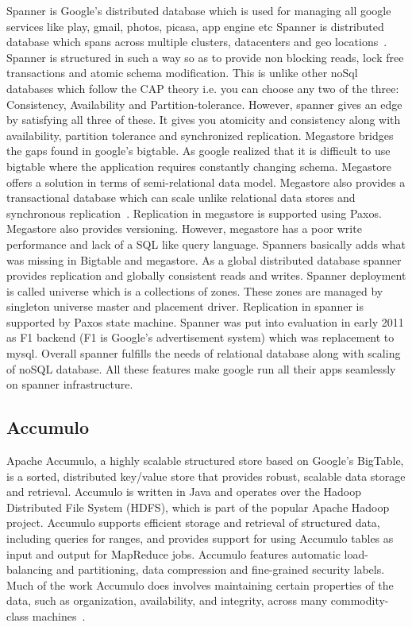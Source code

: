 Spanner is Google's distributed database which is used for managing
all google services like play, gmail, photos, picasa, app engine etc
Spanner is distributed database which spans across multiple clusters,
datacenters and geo locations~\cite{corbett-spanner}.  Spanner is
structured in such a way so as to provide non blocking reads, lock
free transactions and atomic schema modification. This is unlike other
noSql databases which follow the CAP theory i.e. you can choose any
two of the three: Consistency, Availability and
Partition-tolerance. However, spanner gives an edge by satisfying all
three of these. It gives you atomicity and consistency along with
availability, partition tolerance and synchronized replication.
Megastore bridges the gaps found in google's bigtable. As google
realized that it is difficult to use bigtable where the application
requires constantly changing schema. Megastore offers a solution in
terms of semi-relational data model.  Megastore also provides a
transactional database which can scale unlike relational data stores
and synchronous replication~\cite{www-magastore-spanner}.  Replication
in megastore is supported using Paxos. Megastore also provides
versioning. However, megastore has a poor write performance and lack
of a SQL like query language. Spanners basically adds what was missing
in Bigtable and megastore. As a global distributed database spanner
provides replication and globally consistent reads and writes. Spanner
deployment is called universe which is a collections of zones. These
zones are managed by singleton universe master and placement
driver. Replication in spanner is supported by Paxos state
machine. Spanner was put into evaluation in early 2011 as F1 backend
(F1 is Google's advertisement system) which was replacement to
mysql. Overall spanner fulfills the needs of relational database along
with scaling of noSQL database.  All these features make google run
all their apps seamlessly on spanner infrastructure.

     \pv

\subsection{Accumulo}

Apache Accumulo, a highly scalable structured store based on Google's
BigTable, is a sorted, distributed key/value store that provides
robust, scalable data storage and retrieval. Accumulo is written in
Java and operates over the Hadoop Distributed File System (HDFS),
which is part of the popular Apache Hadoop project. Accumulo supports
efficient storage and retrieval of structured data, including queries
for ranges, and provides support for using Accumulo tables as input
and output for MapReduce jobs.  Accumulo features automatic
load-balancing and partitioning, data compression and fine-grained
security labels. Much of the work Accumulo does involves maintaining
certain properties of the data, such as organization, availability,
and integrity, across many commodity-class
machines~\cite{apache-accumulo}.

